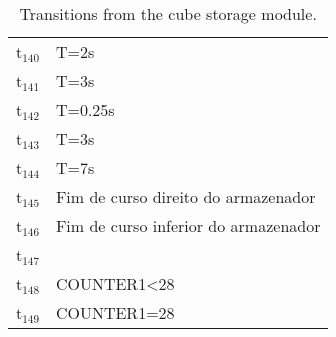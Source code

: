 \begin{table}[htbp]
\caption{Transitions from the cube storage module.}
\centering
\begin{tabular}{ll}
t\(_{\text{140}}\) & T=2s\\
t\(_{\text{141}}\) & T=3s\\
t\(_{\text{142}}\) & T=0.25s\\
t\(_{\text{143}}\) & T=3s\\
t\(_{\text{144}}\) & T=7s\\
t\(_{\text{145}}\) & Fim de curso direito do armazenador\\
t\(_{\text{146}}\) & Fim de curso inferior do armazenador\\
t\(_{\text{147}}\) & \\
t\(_{\text{148}}\) & COUNTER1<28\\
t\(_{\text{149}}\) & COUNTER1=28\\
\end{tabular}
\end{table}
